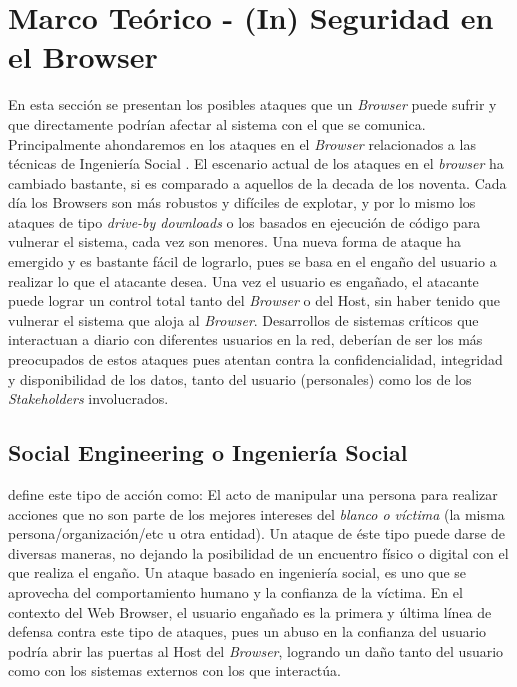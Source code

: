 \chapter{Marco Teórico - (In) Seguridad en el Browser}
\label{chap3:MT}


En esta sección se presentan los posibles ataques que un \textit{Browser} puede sufrir y que directamente podrían afectar al sistema con el que se comunica. Principalmente ahondaremos en los ataques en el \textit{Browser} relacionados a las técnicas de Ingeniería Social \cite{socEngineeering}. El escenario actual de los ataques en el \textit{browser} ha cambiado bastante, si es comparado a aquellos de la decada de los noventa. Cada día los Browsers son más robustos y difíciles de explotar, y por lo mismo los ataques de tipo \textit{drive-by downloads} o los basados en ejecución de código para vulnerar el sistema, cada vez son menores. Una nueva forma de ataque ha emergido y es bastante fácil de lograrlo, pues se basa en el engaño del usuario a realizar lo que el atacante desea. Una vez el usuario es engañado, el atacante puede lograr un control total tanto del \textit{Browser} o del Host, sin haber tenido que vulnerar el sistema \cite{Rajab2013,Labs2013} que aloja al \textit{Browser}. Desarrollos de sistemas críticos que interactuan a diario con diferentes usuarios en la red, deberían de ser los más preocupados de estos ataques pues atentan contra la confidencialidad, integridad y disponibilidad de los datos, tanto del usuario (personales) como los de los \textit{Stakeholders} involucrados.

\section{Social Engineering o Ingeniería Social}
\cite{socEngineeering} define este tipo de acción como: El acto de manipular una persona para realizar acciones que no son parte de los mejores intereses del \textit{blanco o víctima} (la misma persona/organización/etc u otra entidad). Un ataque de éste tipo puede darse de diversas maneras, no dejando la posibilidad de un encuentro físico o digital con el que realiza el engaño. Un ataque basado en ingeniería social, es uno que se aprovecha del comportamiento humano y la confianza de la víctima. En el contexto del Web Browser, el usuario engañado es la primera y última línea de defensa contra este tipo de ataques, pues un abuso en la confianza del usuario podría abrir las puertas al Host del \textit{Browser}, logrando un daño tanto del usuario como con los sistemas externos con los que interactúa.

